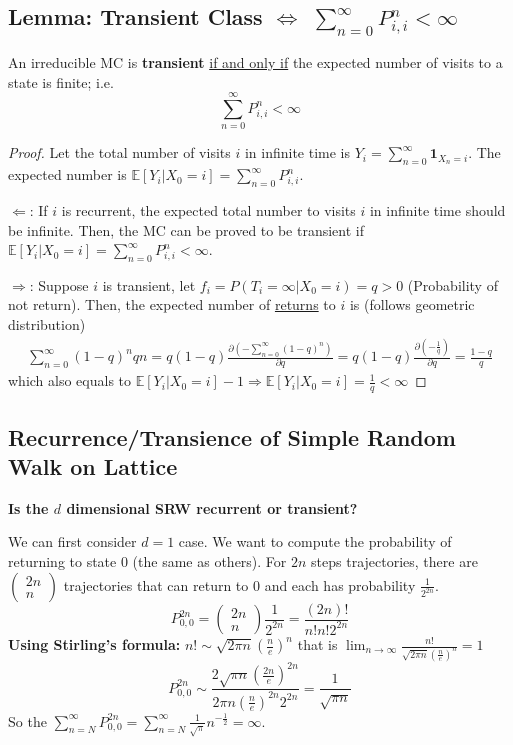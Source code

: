 \documentclass[11pt]{elegantbook}
\begin{document}
\subsection{Lemma: Transient Class $\Leftrightarrow$ $\sum_{n=0}^\infty P_{i,i}^n<\infty$}
\begin{lemma}
    An irreducible MC is \textbf{transient} \underline{if and only if} the expected number of visits to a state is finite; i.e. $$\sum_{n=0}^\infty P_{i,i}^n<\infty$$
\end{lemma}
\begin{proof}
    Let the total number of visits $i$ in infinite time is $Y_i=\sum_{n=0}^\infty \mathbf{1}_{X_n=i}$. The expected number is $\mathbb{E}[Y_i|X_0=i]=\sum_{n=0}^\infty P_{i,i}^n$.
    
    $\Leftarrow$: If $i$ is recurrent, the expected total number to visits $i$ in infinite time should be infinite.
    Then, the MC can be proved to be transient if $\mathbb{E}[Y_i|X_0=i]=\sum_{n=0}^\infty P_{i,i}^n<\infty$.

    $\Rightarrow$: Suppose $i$ is transient, let $f_i=P(T_i=\infty|X_0=i)=q>0$ (Probability of not return). Then, the expected number of \underline{returns} to $i$ is (follows geometric distribution)
    \begin{equation}
        \begin{aligned}
            \sum_{n=0}^\infty (1-q)^nqn=q(1-q)\frac{\partial \left(-\sum_{n=0}^\infty(1-q)^n\right)}{\partial q}=q(1-q)\frac{\partial \left(-\frac{1}{q}\right)}{\partial q}=\frac{1-q}{q}
        \end{aligned}
        \nonumber
    \end{equation}
    which also equals to $\mathbb{E}[Y_i|X_0=i]-1 \Rightarrow \mathbb{E}[Y_i|X_0=i]=\frac{1}{q}<\infty$
\end{proof}

\subsection{Recurrence/Transience of Simple Random Walk on Lattice}
\textbf{Is the $d$ dimensional SRW recurrent or transient?}

We can first consider $d=1$ case. We want to compute the probability of returning to state $0$ (the same as others). For $2n$ steps trajectories, there are $\begin{pmatrix}
    2n\\
    n
\end{pmatrix}$ trajectories that can return to $0$ and each has probability $\frac{1}{2^{2n}}$.
$$P_{0,0}^{2n}=\begin{pmatrix}
    2n\\
    n
\end{pmatrix}\frac{1}{2^{2n}}=\frac{(2n)!}{n!n!2^{2n}}$$
\textbf{Using Stirling's formula:} $n!\sim\sqrt{2\pi n}\left(\frac{n}{e}\right)^n$ that is $\lim_{n \rightarrow \infty}\frac{n!}{\sqrt{2\pi n}\left(\frac{n}{e}\right)^n}=1$
$$P_{0,0}^{2n}\sim\frac{2\sqrt{\pi n}\left(\frac{2n}{e}\right)^{2n}}{2\pi n\left(\frac{n}{e}\right)^{2n}2^{2n}}=\frac{1}{\sqrt{\pi n}}$$
So the $\sum_{n=N}^\infty P_{0,0}^{2n}=\sum_{n=N}^\infty\frac{1}{\sqrt{\pi}}n^{-\frac{1}{2}}=\infty$.
\end{document}
